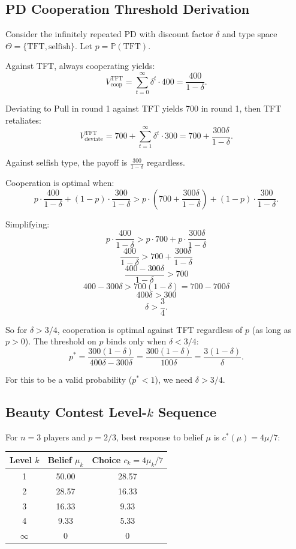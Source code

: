 \documentclass[12pt]{article}
\newcommand{\Prob}{\mathbb{P}}
\begin{document}
\subsection{PD Cooperation Threshold Derivation}

Consider the infinitely repeated PD with discount factor $\delta$ and type space $\Theta = \{\text{TFT}, \text{selfish}\}$. Let $p = \Prob(\text{TFT})$.

Against TFT, always cooperating yields:
\[
V_{\text{coop}}^{\text{TFT}} = \sum_{t=0}^{\infty} \delta^t \cdot 400 = \frac{400}{1-\delta}.
\]

Deviating to Pull in round 1 against TFT yields 700 in round 1, then TFT retaliates:
\[
V_{\text{deviate}}^{\text{TFT}} = 700 + \sum_{t=1}^{\infty} \delta^t \cdot 300 = 700 + \frac{300\delta}{1-\delta}.
\]

Against selfish type, the payoff is $\frac{300}{1-\delta}$ regardless.

Cooperation is optimal when:
\[
p \cdot \frac{400}{1-\delta} + (1-p) \cdot \frac{300}{1-\delta} > p \cdot \left(700 + \frac{300\delta}{1-\delta}\right) + (1-p) \cdot \frac{300}{1-\delta}.
\]

Simplifying:
\[
p \cdot \frac{400}{1-\delta} > p \cdot 700 + p \cdot \frac{300\delta}{1-\delta}
\]
\[
\frac{400}{1-\delta} > 700 + \frac{300\delta}{1-\delta}
\]
\[
\frac{400 - 300\delta}{1-\delta} > 700
\]
\[
400 - 300\delta > 700(1-\delta) = 700 - 700\delta
\]
\[
400\delta > 300
\]
\[
\delta > \frac{3}{4}.
\]

So for $\delta > 3/4$, cooperation is optimal against TFT regardless of $p$ (as long as $p > 0$). The threshold on $p$ binds only when $\delta < 3/4$:
\[
p^* = \frac{300(1-\delta)}{400\delta - 300\delta} = \frac{300(1-\delta)}{100\delta} = \frac{3(1-\delta)}{\delta}.
\]

For this to be a valid probability ($p^* < 1$), we need $\delta > 3/4$.

\subsection{Beauty Contest Level-$k$ Sequence}

For $n = 3$ players and $p = 2/3$, best response to belief $\mu$ is $c^*(\mu) = 4\mu/7$:

\begin{center}
\begin{tabular}{@{}ccc@{}}
\toprule
Level $k$ & Belief $\mu_k$ & Choice $c_k = 4\mu_k/7$ \\
\midrule
1 & 50.00 & 28.57 \\
2 & 28.57 & 16.33 \\
3 & 16.33 & 9.33 \\
4 & 9.33 & 5.33 \\
$\infty$ & 0 & 0 \\
\bottomrule
\end{tabular}
\end{center}
\end{document}
